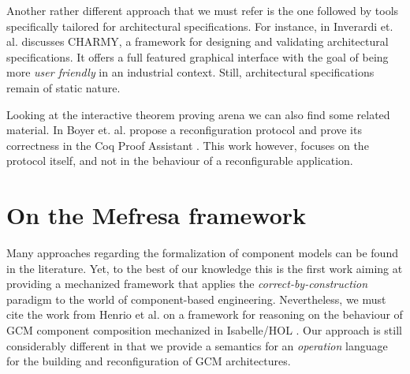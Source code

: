 	Another rather different approach that we must refer is the one followed by tools 
	specifically tailored for architectural specifications. For instance, in \cite{p.2005-1} Inverardi et. al. 
	discusses \textsf{CHARMY}, a framework for designing and validating architectural 
	specifications. It offers a full featured graphical interface with the goal of being more 
	\textit{user friendly} in an industrial context. Still,
	architectural specifications remain of static nature. 
	
	
	
		Looking at the interactive theorem proving arena we can also find some
	related material. In %
	\cite{Boyer:2013:RRC:2486788.2486791} Boyer et. al. propose a reconfiguration protocol
	and prove its correctness in the Coq Proof Assistant \cite{09thecoq}. This work however, focuses on the protocol itself, 
	and not in the behaviour of a reconfigurable application. 
   





\section{On the Mefresa framework}
\label{sec:relmefresa}



 
 Many approaches regarding the formalization of component models can be found in the literature. Yet,
	to the best of our knowledge this is the first work aiming at providing a mechanized framework
    that applies the \textit{correct-by-construction} paradigm to the world of component-based engineering.
	Nevertheless, we must cite the work from Henrio et al. \cite{HKK:FMCO09} on a framework for reasoning 
	on the behaviour of GCM component composition mechanized in Isabelle/HOL \cite{Nipkow-Paulson-Wenzel:2002}. 
	Our approach is still considerably different
	in that we provide a semantics for an \textit{operation} language for the building 
	and reconfiguration of GCM architectures.
	
	
